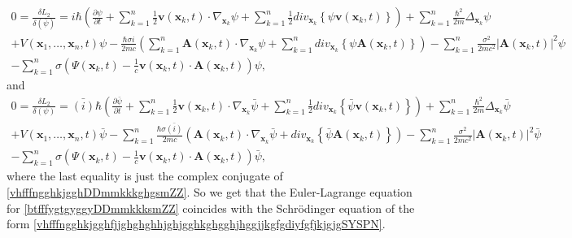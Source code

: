 \documentclass{article}
\theoremstyle{definition}
\theoremstyle{remark}
\renewcommand{\vec}[1]{\mathbf{#1}}
\newcommand{\er}{\eqref}
\newcommand{\er}{\eqref}
\begin{document}
\begin{multline}\label{vhfffngghkjgghDDmmkkkghgsmZZ}
0=\frac{\delta L_2}{\delta (\bar\psi)}=
i\hbar\left(\frac{\partial\psi}{\partial
t}+\sum\limits_{k=1}^{n}\frac{1}{2}\vec v(\vec
x_k,t)\cdot\nabla_{\vec
x_k}\psi+\sum\limits_{k=1}^{n}\frac{1}{2}div_{\vec
x_k}\left\{\psi\vec v(\vec
x_k,t)\right\}\right)+\sum\limits_{k=1}^{n}\frac{\hbar^2}{2m}\Delta_{\vec
x_k}\psi\\+V\left(\vec x_1,\ldots,\vec x_n,t\right)\psi
-\frac{\hbar\sigma i}{2mc}\left(\sum\limits_{k=1}^{n}\vec A(\vec
x_k,t)\cdot\nabla_{\vec x_k}\psi+\sum\limits_{k=1}^{n}div_{\vec
x_k}\left\{\psi\vec A(\vec
x_k,t)\right\}\right)-\sum\limits_{k=1}^{n}\frac{\sigma^2}{2mc^2}\left|\vec
A(\vec x_k,t)\right|^2\psi
\\-\sum\limits_{k=1}^{n}\sigma\left(\Psi(\vec x_k,t)-\frac{1}{c}\vec
v(\vec x_k,t)\cdot\vec A(\vec x_k,t)\right)\psi,
\end{multline}
and
\begin{multline}\label{vhfffngghkjgghDDmmkkkghguhyuysmZZ}
0=\frac{\delta L_2}{\delta (\psi)}= \bar
{(i)}\hbar\left(\frac{\partial\bar\psi}{\partial
t}+\sum\limits_{k=1}^{n}\frac{1}{2}\vec v(\vec
x_k,t)\cdot\nabla_{\vec
x_k}\bar\psi+\sum\limits_{k=1}^{n}\frac{1}{2}div_{\vec
x_k}\left\{\bar\psi\vec v(\vec
x_k,t)\right\}\right)+\sum\limits_{k=1}^{n}\frac{\hbar^2}{2m}\Delta_{\vec
x_k}\bar\psi \\+V\left(\vec x_1,\ldots,\vec x_n,t\right)\bar\psi
-\sum\limits_{k=1}^{n}\frac{\hbar\sigma \bar {(i)}}{2mc}\left(\vec
A(\vec x_k,t)\cdot\nabla_{\vec x_k}\bar\psi+div_{\vec
x_k}\left\{\bar\psi\vec A(\vec
x_k,t)\right\}\right)-\sum\limits_{k=1}^{n}\frac{\sigma^2}{2mc^2}\left|\vec
A(\vec x_k,t)\right|^2\bar\psi
\\-\sum\limits_{k=1}^{n}\sigma\left(\Psi(\vec x_k,t)-\frac{1}{c}\vec v(\vec x_k,t)\cdot\vec
A(\vec x_k,t)\right)\bar\psi,
\end{multline}
where the last equality is just the complex conjugate of
\er{vhfffngghkjgghDDmmkkkghgsmZZ}. So we get that the Euler-Lagrange
equation for \er{btfffygtgyggyDDmmkkksmZZ} coincides with the
Schr\"{o}dinger equation of the form
\er{vhfffngghkjgghfjjghghghhjghjgghkghgghjhggjjkgfgdiyfgfjkjgjgSYSPN}.
\end{document}
